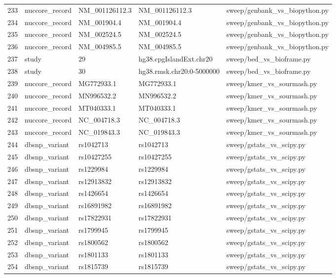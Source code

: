 {\begin{longtable}{rllp{3.2cm}p{4.2cm}}
233 & nuccore\_record & NM\_001126112.3 & NM\_001126112.3 & sweep/genbank\_vs\_biopython.py\\
234 & nuccore\_record & NM\_001904.4 & NM\_001904.4 & sweep/genbank\_vs\_biopython.py\\
235 & nuccore\_record & NM\_002524.5 & NM\_002524.5 & sweep/genbank\_vs\_biopython.py\\
236 & nuccore\_record & NM\_004985.5 & NM\_004985.5 & sweep/genbank\_vs\_biopython.py\\
237 & study & 29 & hg38.cpgIslandExt.chr20 & sweep/bed\_vs\_bioframe.py\\
238 & study & 30 & hg38.rmsk.chr20:0-5000000 & sweep/bed\_vs\_bioframe.py\\
239 & nuccore\_record & MG772933.1 & MG772933.1 & sweep/kmer\_vs\_sourmash.py\\
240 & nuccore\_record & MN996532.2 & MN996532.2 & sweep/kmer\_vs\_sourmash.py\\
241 & nuccore\_record & MT040333.1 & MT040333.1 & sweep/kmer\_vs\_sourmash.py\\
242 & nuccore\_record & NC\_004718.3 & NC\_004718.3 & sweep/kmer\_vs\_sourmash.py\\
243 & nuccore\_record & NC\_019843.3 & NC\_019843.3 & sweep/kmer\_vs\_sourmash.py\\
244 & dbsnp\_variant & rs1042713 & rs1042713 & sweep/gstats\_vs\_scipy.py\\
245 & dbsnp\_variant & rs10427255 & rs10427255 & sweep/gstats\_vs\_scipy.py\\
246 & dbsnp\_variant & rs1229984 & rs1229984 & sweep/gstats\_vs\_scipy.py\\
247 & dbsnp\_variant & rs12913832 & rs12913832 & sweep/gstats\_vs\_scipy.py\\
248 & dbsnp\_variant & rs1426654 & rs1426654 & sweep/gstats\_vs\_scipy.py\\
249 & dbsnp\_variant & rs16891982 & rs16891982 & sweep/gstats\_vs\_scipy.py\\
250 & dbsnp\_variant & rs17822931 & rs17822931 & sweep/gstats\_vs\_scipy.py\\
251 & dbsnp\_variant & rs1799945 & rs1799945 & sweep/gstats\_vs\_scipy.py\\
252 & dbsnp\_variant & rs1800562 & rs1800562 & sweep/gstats\_vs\_scipy.py\\
253 & dbsnp\_variant & rs1801133 & rs1801133 & sweep/gstats\_vs\_scipy.py\\
254 & dbsnp\_variant & rs1815739 & rs1815739 & sweep/gstats\_vs\_scipy.py\\

\end{longtable}}
